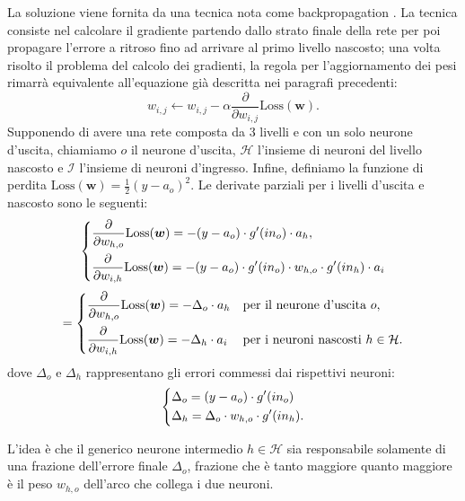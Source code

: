 \documentclass[../../main.tex]{subfiles}
\begin{document}
La soluzione viene fornita da una tecnica nota come backpropagation \cite{Rumelhart1986LearningRB}. La tecnica consiste nel calcolare il gradiente partendo dallo strato finale della rete per poi propagare l'errore a ritroso fino ad arrivare al primo livello nascosto; una volta risolto il problema del calcolo dei gradienti, la regola per l'aggiornamento dei pesi rimarrà equivalente all'equazione già descritta nei paragrafi precedenti:
\begin{equation}
    w_{i,j} \leftarrow w_{i,j} - \alpha \frac{\partial}{\partial w_{i,j}}\mathrm{Loss}(\boldsymbol{w}).
    \label{eqn:mlpgradientdesc}
\end{equation}
Supponendo di avere una rete composta da 3 livelli e con un solo neurone d'uscita, chiamiamo $o$ il neurone d'uscita, $\mathcal{H}$ l'insieme di neuroni del livello nascosto e $\mathcal{I}$ l'insieme di neuroni d'ingresso. Infine, definiamo la funzione di perdita $\mathrm{Loss}(\boldsymbol{w}) = \frac{1}{2} (y - a_o)^2$. Le derivate parziali per i livelli d'uscita e nascosto sono le seguenti:
\begin{equation*}
    \begin{dcases}
        \frac{\partial}{\partial w_{h,o}} \mathrm{Loss}(\boldsymbol{w}) = - (y - a_{o}) \cdot g'(in_o) \cdot a_h,\\
        \frac{\partial}{\partial w_{i,h}} \mathrm{Loss}(\boldsymbol{w}) =  - (y - a_{o}) \cdot g'(in_o) \cdot w_{h,o} \cdot g'(in_h) \cdot a_i
    \end{dcases}
\end{equation*}
\begin{equation}
    =
    \begin{dcases}
        \frac{\partial}{\partial w_{h,o}} \mathrm{Loss}(\boldsymbol{w}) = - \Delta_o \cdot a_h & \text{per il neurone d'uscita } o,\\
        \frac{\partial}{\partial w_{i,h}} \mathrm{Loss}(\boldsymbol{w}) = - \Delta_h \cdot a_i& \text{per i neuroni nascosti } h \in \mathcal{H}.
    \end{dcases}   
    \label{eqn:backpropgradient}
\end{equation}
dove $\Delta_o$ e $\Delta_h$ rappresentano gli errori commessi dai rispettivi neuroni:
\[
\begin{dcases}
    \Delta_o = (y - a_{o}) \cdot g'(in_o)\\
    \Delta_h = \Delta_o \cdot w_{h,o} \cdot g'(in_h) .
\end{dcases}    
\]

L'idea è che il generico neurone intermedio $h \in \mathcal{H}$ sia responsabile solamente di una frazione dell'errore finale $\Delta_o$, frazione che è tanto maggiore quanto maggiore è il peso $w_{h,o}$ dell'arco che collega i due neuroni.
\end{document}
